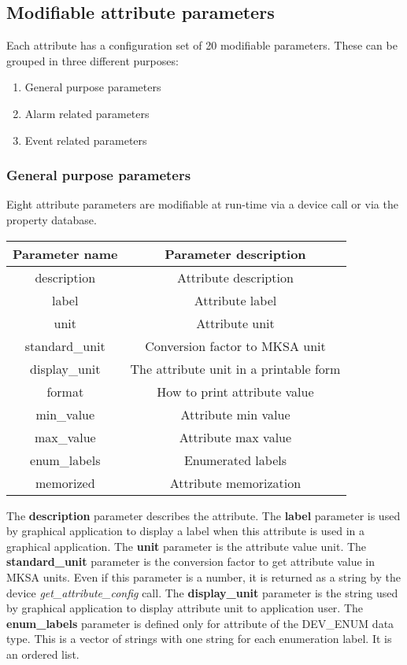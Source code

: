 \subsection{Modifiable attribute parameters}

Each attribute has a configuration set of 20 modifiable parameters.
These can be grouped in three different purposes:
\begin{enumerate}
\item General purpose parameters
\item Alarm related parameters
\item Event related parameters
\end{enumerate}

\subsubsection{General purpose parameters}

Eight attribute parameters are modifiable at run-time via a device
call or via the property database.

\vspace{0.3cm}

\begin{center}
\begin{longtable}{|c|c|}
\hline 
Parameter name & Parameter description\tabularnewline
\hline 
\hline 
description & Attribute description\tabularnewline
\hline 
label & Attribute label\tabularnewline
\hline 
unit & Attribute unit\tabularnewline
\hline 
standard\_unit & Conversion factor to MKSA unit\tabularnewline
\hline 
display\_unit & The attribute unit in a printable form\tabularnewline
\hline 
format & How to print attribute value\tabularnewline
\hline 
min\_value & Attribute min value\tabularnewline
\hline 
max\_value & Attribute max value\tabularnewline
\hline 
enum\_labels & Enumerated labels\tabularnewline
\hline 
memorized & Attribute memorization\tabularnewline
\hline 
\end{longtable}
\par\end{center}

\vspace{0.3cm}

The \textbf{description} parameter describes the
attribute. The \textbf{label} parameter is used by graphical
application to display a label when this attribute is used in a graphical
application. The \textbf{unit} parameter is the attribute
value unit. The \textbf{standard\_unit} parameter
is the conversion factor to get attribute value in MKSA units. Even
if this parameter is a number, it is returned as a string by the device
\emph{get\_attribute\_config} call. The \textbf{display\_unit}
parameter is the string used by graphical application to display attribute
unit to application user. The \textbf{enum\_labels}
parameter is defined only for attribute of the DEV\_ENUM data type.
This is a vector of strings with one string for each enumeration label.
It is an ordered list.

